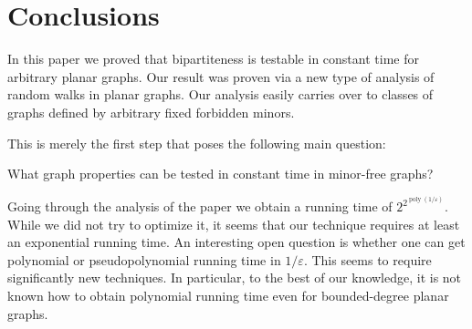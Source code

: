 \documentclass[11pt]{article}
\DeclareMathOperator{\poly}{poly}
\newcommand{\eps}{\ensuremath{\epsilon}}
\def\epsilon{\ensuremath{\varepsilon}}
\begin{document}
\section{Conclusions}

In this paper we proved that bipartiteness is testable in constant time for arbitrary planar graphs. Our result was proven via a new type of analysis of random walks in planar graphs. Our analysis easily carries over to classes of graphs defined by arbitrary fixed forbidden minors.

This is merely the first step that poses the following main question:
\begin{center}
What graph properties can be tested in constant time in minor-free graphs?
\end{center}

Going through the analysis of the paper we obtain a running time of $2^{2^{\poly(1/\eps)}}$. While we did not try to optimize it, it seems that our technique
requires at least an exponential running time. An interesting open question is whether one can get polynomial or pseudopolynomial running time in $1/\epsilon$.
This seems to require significantly new techniques. In particular, to the best of our knowledge, it is not known how to obtain polynomial running time even for bounded-degree planar graphs.
\end{document}
